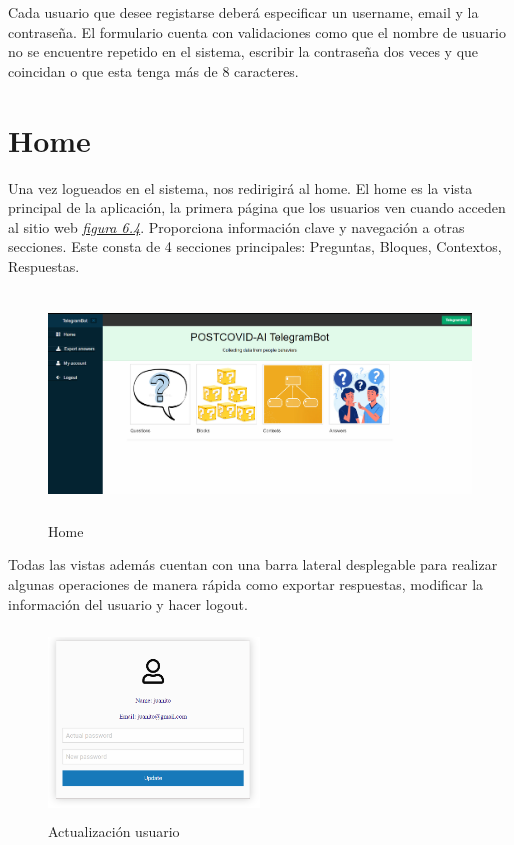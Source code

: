 Cada usuario que desee registarse deberá especificar un username, email y la contraseña. El formulario cuenta con validaciones como que el nombre de usuario no se encuentre repetido en el sistema, escribir la contraseña dos veces y que coincidan o que esta tenga más de 8 caracteres. \vspace{1cm}

\section{Home}

Una vez logueados en el sistema, nos redirigirá al home. El home es la vista principal de la aplicación, la primera página que los usuarios ven cuando acceden al sitio web \textit{\hyperref[fig:home]{figura 6.4}}. Proporciona información clave y navegación a otras secciones. Este consta de 4 secciones principales: Preguntas, Bloques, Contextos, Respuestas.\vspace{0.5cm}

\begin{figure}[!ht]
    \centering
    \includegraphics[width=1\textwidth, height=6cm]{imagenes/home.png}
    \caption{ Home }
    \label{fig:home}
\end{figure}
\vspace{0.5cm}

Todas las vistas además cuentan con una barra lateral desplegable para realizar algunas operaciones de manera rápida como exportar respuestas, modificar la información del usuario y hacer logout. 

\begin{figure}[!ht]
    \centering
    \includegraphics[width=0.5\textwidth, height=5cm]{imagenes/user_update.png}
    \caption{ Actualización usuario }
    \label{fig:modify-user}
\end{figure}

